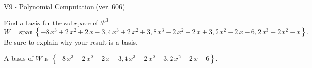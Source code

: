 \begin{exercise}
  \begin{exerciseTitle}V9 - Polynomial Computation (ver. 606)\end{exerciseTitle}
  \begin{exerciseStatement}
    Find a basis for the subspace of \(\mathcal{P}^3\) 
\[W=\mathrm{span}\ \left\{-8 \, x^{3} + 2 \, x^{2} + 2 \, x - 3 , 4 \, x^{3} + 2 \, x^{2} + 3 , 8 \, x^{3} - 2 \, x^{2} - 2 \, x + 3 , 2 \, x^{2} - 2 \, x - 6 , 2 \, x^{3} - 2 \, x^{2} - x\right\}.\]
 Be sure to explain why your result is a basis.


  \end{exerciseStatement}
  \begin{exerciseAnswer}
   A basis of \(W\) is  \(\left\{-8 \, x^{3} + 2 \, x^{2} + 2 \, x - 3 , 4 \, x^{3} + 2 \, x^{2} + 3 , 2 \, x^{2} - 2 \, x - 6\right\}\).
  


  \end{exerciseAnswer}
\end{exercise}